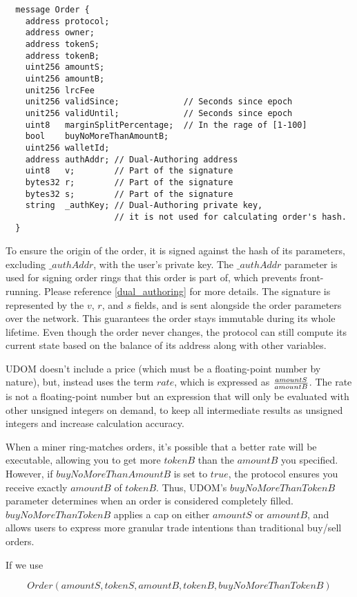 \documentclass[UTF8,nofonts]{article}
\begin{document}
\begin{verbatim}
  message Order {
    address protocol;
    address owner;
    address tokenS;
    address tokenB;
    uint256 amountS;
    uint256 amountB;
    unit256 lrcFee
    unit256 validSince;             // Seconds since epoch
    unit256 validUntil;             // Seconds since epoch
    uint8   marginSplitPercentage;  // In the rage of [1-100]
    bool    buyNoMoreThanAmountB;
    uint256 walletId;
    address authAddr; // Dual-Authoring address
    uint8   v;        // Part of the signature
    bytes32 r;        // Part of the signature
    bytes32 s;        // Part of the signature
    string  _authKey; // Dual-Authoring private key,
                      // it is not used for calculating order's hash.
  }
\end{verbatim}
To ensure the origin of the order, it is signed against the hash of its parameters, excluding $\_authAddr$, with the user's private key. The $\_authAddr$ parameter is used for signing  order rings that this order is part of, which prevents front-running. Please reference \ref{dual_authoring} for more details. The signature is represented by the $v$, $r$, and $s$ fields, and is sent alongside the order parameters over the network. This guarantees the order stays immutable during its whole lifetime. Even though the order never changes, the protocol can still compute its current state based on the balance of its address along with other variables.


UDOM doesn't include a price (which must be a floating-point number by nature), but, instead uses the term $rate$, which is expressed as $amountS \over amountB$. The rate is not a floating-point number but an expression that will only be evaluated with other unsigned integers on demand, to keep all intermediate results as unsigned integers and increase calculation accuracy. 

When a miner ring-matches orders, it's possible that a better rate will be executable, allowing you to get more $tokenB$ than the $amountB$ you specified. However, if $buyNoMoreThanAmountB$ is set to $true$, the protocol ensures you receive exactly $amountB$ of $tokenB$. Thus, UDOM's $buyNoMoreThanTokenB$ parameter determines when an order is considered completely filled. $buyNoMoreThanTokenB$ applies a cap on either $amountS$ or $amountB$, and allows users to express more granular trade intentions than traditional buy/sell orders. 

If we use

\begin{equation}
	Order(amountS, tokenS, amountB, tokenB, buyNoMoreThanTokenB)
\end{equation}
\end{document}
